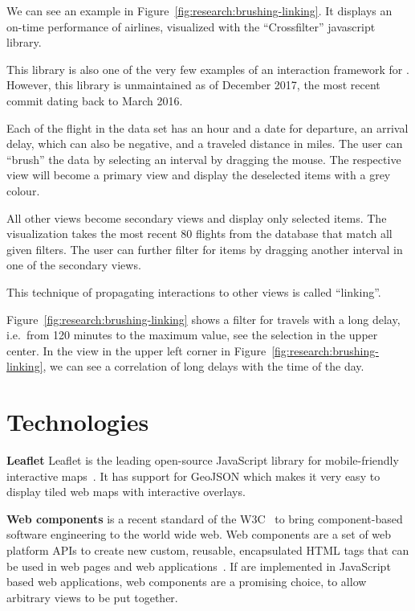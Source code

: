 We can see an example in Figure~\ref{fig:research:brushing-linking}.
It displays an on-time performance of airlines, visualized with the ``Crossfilter'' javascript library.

This library is also one of the very few examples of an interaction framework for \cmvs{}.
However, this library is unmaintained as of December 2017, the most recent commit dating back to March 2016.

Each of the flight in the data set has an hour and a date for departure, an arrival delay, which can also be negative, and a traveled distance in miles.
The user can ``brush'' the data by selecting an interval by dragging the mouse.
The respective view will become a primary view and display the deselected items with a grey colour.

All other views become secondary views and display only selected items.
The visualization takes the most recent 80 flights from the database that match all given filters.
The user can further filter for items by dragging another interval in one of the secondary views.

This technique of propagating interactions to other views is called ``linking''.

Figure~\ref{fig:research:brushing-linking} shows a filter for travels with a long delay, i.e.\ from 120 minutes to the maximum value, see the selection in the upper center.
In the view in the upper left corner in Figure~\ref{fig:research:brushing-linking}, we can see a correlation of long delays with the time of the day.

\section{Technologies}


\textbf{Leaflet}
Leaflet is the leading open-source JavaScript library for mobile-friendly interactive maps~\parencite{Leaflet2017}.
It has support for GeoJSON which makes it very easy to display tiled web maps with interactive overlays.

\textbf{Web components} is a recent standard of the W3C~\parencite{W3C2017} to bring component-based software engineering to the world wide web.
Web components are a set of web platform APIs to create new custom, reusable, encapsulated HTML tags that can be used in web pages and web applications~\parencite{WebComponents2017}.
If \cmvs{} are implemented in JavaScript based web applications, web components are a promising choice, to allow arbitrary views to be put together.

